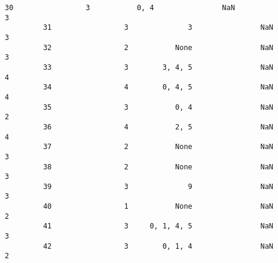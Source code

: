 \documentclass[11pt]{article}
\begin{document}
\begin{Verbatim}[commandchars=\\\{\}]
         30                 3           0, 4                NaN                 3   
         31                 3              3                NaN                 3   
         32                 2           None                NaN                 3   
         33                 3        3, 4, 5                NaN                 4   
         34                 4        0, 4, 5                NaN                 4   
         35                 3           0, 4                NaN                 2   
         36                 4           2, 5                NaN                 4   
         37                 2           None                NaN                 3   
         38                 2           None                NaN                 3   
         39                 3              9                NaN                 3   
         40                 1           None                NaN                 2   
         41                 3     0, 1, 4, 5                NaN                 3   
         42                 3        0, 1, 4                NaN                 2   
         

\end{Verbatim}
\end{document}
